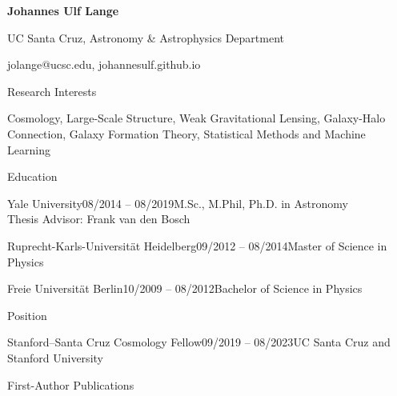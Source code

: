 \documentclass{resume}
\begin{document}
\centerline{\color{blue} \LARGE \bf Johannes Ulf Lange}
\centerline{UC Santa Cruz, Astronomy \& Astrophysics Department}
\centerline{jolange@ucsc.edu, johannesulf.github.io}
\medskip

\begin{rSection}{Research Interests}
  \begin{adjustwidth}{0.5cm}{}
    Cosmology, Large-Scale Structure, Weak Gravitational Lensing, Galaxy-Halo Connection, Galaxy Formation Theory, Statistical Methods and Machine Learning
  \end{adjustwidth}
\end{rSection}

\begin{rSection}{Education}
  \begin{adjustwidth}{0.5cm}{}
    \begin{rSubsection}{Yale University}{08/2014 -- 08/2019}{M.Sc., M.Phil, Ph.D. in Astronomy\\Thesis Advisor: Frank van den Bosch}{}\end{rSubsection}

    \begin{rSubsection}{Ruprecht-Karls-Universität Heidelberg}{09/2012 -- 08/2014}{Master of Science in Physics}{}\end{rSubsection}

    \begin{rSubsection}{Freie Universität Berlin}{10/2009 -- 08/2012}{Bachelor of Science in Physics}{}\end{rSubsection}
  \end{adjustwidth}
\end{rSection}

\begin{rSection}{Position}
  \begin{adjustwidth}{0.5cm}{}
    \begin{rSubsection}{Stanford--Santa Cruz Cosmology Fellow}{09/2019 -- 08/2023}{UC Santa Cruz and Stanford University}{}\end{rSubsection}
  \end{adjustwidth}
\end{rSection}

\begin{refsection}
  \begin{rSection}{First-Author Publications}
    \setlength{\leftskip}{0.5cm}
    \nocite{Lange2021_inprep, Lange2020_arXiv_2011_2377, Lange2019_MNRAS_490_1870, Lange2019_MNRAS_488_5771, Lange2019_MNRAS_487_3112, Lange2019_MNRAS_482_4824, Lange2018_MNRAS_473_2830, Lange2016_ApJ_819_4, Lange2015_MNRAS_447_939, Lange2013_AA_551_89}
    \printbibliography[heading=none]
  \end{rSection}
\end{refsection}
\end{document}
